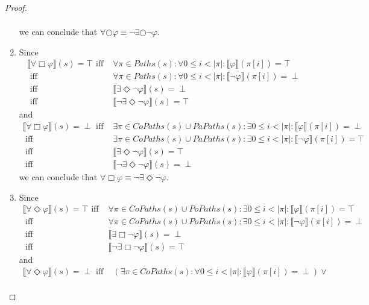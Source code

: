 \documentclass[12pt]{article}
\newcommand{\always}{\Box}
\newcommand{\eventually}{\Diamond}
\newcommand{\nxt}{\bigcirc}
\theoremstyle{definition}
\newcommand{\satisfaction}[1]{\llbracket #1 \rrbracket}
\begin{document}
\begin{proof}
\begin{enumerate}
\begin{align*}
\end{align*}
we can conclude that $\forall \nxt \varphi \equiv \neg \exists \nxt \neg \varphi$.
\item
Since
\begin{align*}
\satisfaction{\forall \always \varphi}(s) = \top
\mbox{ iff } & \forall \pi \in \mathit{Paths}(s) : \forall 0 \leq i < |\pi| : \satisfaction{\varphi}(\pi[i]) = \top\\
\mbox{ iff } & \forall \pi \in \mathit{Paths}(s) : \forall 0 \leq i < |\pi| : \satisfaction{\neg \varphi}(\pi[i]) = \perp\\
\mbox{ iff } & \satisfaction{\exists \eventually \neg \varphi}(s) = \perp\\
\mbox{ iff } & \satisfaction{\neg \exists \eventually \neg \varphi}(s) = \top
\end{align*}
and
\begin{align*}
\satisfaction{\forall \always \varphi}(s) = \perp
\mbox{ iff } & \exists \pi \in \mathit{CoPaths}(s) \cup \mathit{PaPaths}(s) : \exists 0 \leq i < |\pi| : \satisfaction{\varphi}(\pi[i]) = \perp\\
\mbox{ iff } & \exists \pi \in \mathit{CoPaths}(s) \cup \mathit{PaPaths}(s) : \exists 0 \leq i < |\pi| : \satisfaction{\neg \varphi}(\pi[i]) = \top\\
\mbox{ iff } & \satisfaction{\exists \eventually \neg \varphi}(s) = \top\\
\mbox{ iff } & \satisfaction{\neg \exists \eventually \neg \varphi}(s) = \perp
\end{align*}
we can conclude that $\forall \always \varphi \equiv \neg \exists \eventually \neg \varphi$.
\item
Since
\begin{align*}
\satisfaction{\forall \eventually \varphi}(s) = \top
\mbox{ iff } & \forall \pi \in \mathit{CoPaths}(s) \cup \mathit{PoPaths}(s) : \exists 0 \leq i < |\pi| : \satisfaction{\varphi}(\pi[i]) = \top\\
\mbox{ iff } & \forall \pi \in \mathit{CoPaths}(s) \cup \mathit{PoPaths}(s) : \exists 0 \leq i < |\pi| : \satisfaction{\neg \varphi}(\pi[i]) = \perp\\
\mbox{ iff } & \satisfaction{\exists \always \neg \varphi}(s) = \perp\\
\mbox{ iff } & \satisfaction{\neg \exists \always \neg \varphi}(s) = \top
\end{align*}
and
\begin{align*}
\satisfaction{\forall \eventually \varphi}(s) = \perp
\mbox{ iff } & (\exists \pi \in \mathit{CoPaths}(s) : \forall 0 \leq i < |\pi| : \satisfaction{\varphi}(\pi[i]) = \perp) \vee\\

\end{align*}
\end{enumerate}
\end{proof}
\end{document}
